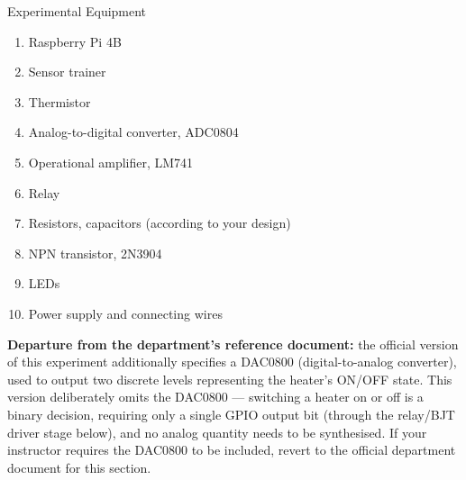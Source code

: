 \begin{labsection}{Experimental Equipment}
  \begin{enumerate}
    \item Raspberry Pi 4B
    \item Sensor trainer
    \item Thermistor
    \item Analog-to-digital converter, ADC0804
    \item Operational amplifier, LM741
    \item Relay
    \item Resistors, capacitors (according to your design)
    \item NPN transistor, 2N3904
    \item LEDs
    \item Power supply and connecting wires
  \end{enumerate}
  \vspace*{0.5em}
  \begin{needsupdate}
    \textbf{Departure from the department's reference document:} the official version of this experiment additionally specifies a DAC0800 (digital-to-analog converter), used to output two discrete levels representing the heater's ON/OFF state. This version deliberately omits the DAC0800 --- switching a heater on or off is a binary decision, requiring only a single GPIO output bit (through the relay/BJT driver stage below), and no analog quantity needs to be synthesised. If your instructor requires the DAC0800 to be included, revert to the official department document for this section.
  \end{needsupdate}
\end{labsection}

\begin{boxedfigure}
  \centering
  \label{fig:exp8rpi-blockdiagram}
\end{boxedfigure}

